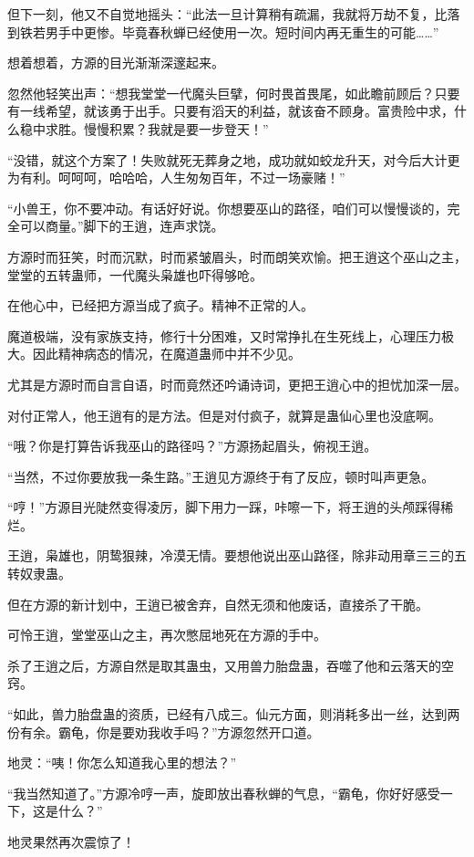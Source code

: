 \begin{this_body}
但下一刻，他又不自觉地摇头：“此法一旦计算稍有疏漏，我就将万劫不复，比落到铁若男手中更惨。毕竟春秋蝉已经使用一次。短时间内再无重生的可能……”

想着想着，方源的目光渐渐深邃起来。

忽然他轻笑出声：“想我堂堂一代魔头巨擘，何时畏首畏尾，如此瞻前顾后？只要有一线希望，就该勇于出手。只要有滔天的利益，就该奋不顾身。富贵险中求，什么稳中求胜。慢慢积累？我就是要一步登天！”

“没错，就这个方案了！失败就死无葬身之地，成功就如蛟龙升天，对今后大计更为有利。呵呵呵，哈哈哈，人生匆匆百年，不过一场豪赌！”

“小兽王，你不要冲动。有话好好说。你想要巫山的路径，咱们可以慢慢谈的，完全可以商量。”脚下的王逍，连声求饶。

方源时而狂笑，时而沉默，时而紧皱眉头，时而朗笑欢愉。把王逍这个巫山之主，堂堂的五转蛊师，一代魔头枭雄也吓得够呛。

在他心中，已经把方源当成了疯子。精神不正常的人。

魔道极端，没有家族支持，修行十分困难，又时常挣扎在生死线上，心理压力极大。因此精神病态的情况，在魔道蛊师中并不少见。

尤其是方源时而自言自语，时而竟然还吟诵诗词，更把王逍心中的担忧加深一层。

对付正常人，他王逍有的是方法。但是对付疯子，就算是蛊仙心里也没底啊。

“哦？你是打算告诉我巫山的路径吗？”方源扬起眉头，俯视王逍。

“当然，不过你要放我一条生路。”王逍见方源终于有了反应，顿时叫声更急。

“哼！”方源目光陡然变得凌厉，脚下用力一踩，咔嚓一下，将王逍的头颅踩得稀烂。

王逍，枭雄也，阴鸷狠辣，冷漠无情。要想他说出巫山路径，除非动用章三三的五转奴隶蛊。

但在方源的新计划中，王逍已被舍弃，自然无须和他废话，直接杀了干脆。

可怜王逍，堂堂巫山之主，再次憋屈地死在方源的手中。

杀了王逍之后，方源自然是取其蛊虫，又用兽力胎盘蛊，吞噬了他和云落天的空窍。

“如此，兽力胎盘蛊的资质，已经有八成三。仙元方面，则消耗多出一丝，达到两份有余。霸龟，你是要劝我收手吗？”方源忽然开口道。

地灵：“咦！你怎么知道我心里的想法？”

“我当然知道了。”方源冷哼一声，旋即放出春秋蝉的气息，“霸龟，你好好感受一下，这是什么？”

地灵果然再次震惊了！


\end{this_body}
